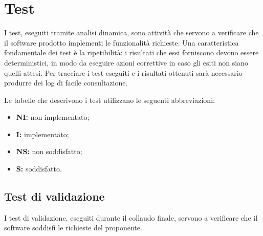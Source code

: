 \newpage

\section{Test}
\label{Test}
	I test, eseguiti tramite analisi dinamica, sono attività che servono a verificare che il software prodotto implementi le funzionalità richieste. Una caratteristica fondamentale dei test è la ripetibilità: i risultati che essi forniscono devono essere deterministici, in modo da eseguire azioni correttive in caso gli esiti non siano quelli attesi.
	Per tracciare i test eseguiti e i risultati ottenuti sarà necessario produrre dei log di facile consultazione.
	
	Le tabelle che descrivono i test utilizzano le seguenti abbreviazioni:
	\begin{itemize}
		\item \textbf{NI:} non implementato;
		\item \textbf{I:} implementato;
		\item \textbf{NS:} non soddisfatto;
		\item \textbf{S:} soddisfatto.
	\end{itemize}
	
	\subsection{Test di validazione}
I test di validazione, eseguiti durante il collaudo finale, servono a verificare che il software soddisfi le richieste del proponente.

